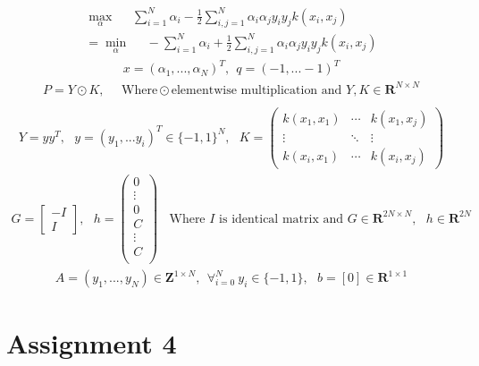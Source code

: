 \documentclass[a4paper,11pt]{article}
\begin{document}
\begin{eqnarray*}
\max_{\alpha} \:\:\:\:\:\:   \sum^N_{i=1} \alpha_i -\frac{1}{2} \sum^N_{i,j=1} \alpha_i \alpha_j y_i y_j k(x_i,x_j) \\
= \min_{\alpha} \:\:\:\:\:\:  -\sum^N_{i=1} \alpha_i +\frac{1}{2} \sum^N_{i,j=1} \alpha_i \alpha_j y_i y_j k(x_i,x_j)
\end{eqnarray*}
\begin{eqnarray*}
x= (\alpha_1,...,\alpha_N)^T, \:\: q=(-1,...-1)^T  
\end{eqnarray*}
\begin{eqnarray*}
P = Y \odot K, \:\:\:\:\:\: \mbox{Where} \odot \mbox{elementwise multiplication and }Y, K \in \mathbf{R}^{N \times N} \\
\end{eqnarray*}
\begin{eqnarray*}
Y = yy^T, \:\:\: y=(y_1,...y_i)^T \in \{ -1, 1\}^N, \:\:\:
K = 
\left(
\begin{array}{cccc}
k(x_1,x_1) & \cdots & k(x_1,x_j) \\
 \vdots & \ddots &  \vdots  \\
 k(x_i,x_1) & \cdots & k(x_i,x_j)
\end{array}
\right)
\end{eqnarray*}
\begin{eqnarray*}
G = 
\left[
\begin{array}{cccc}
-I \\
 I 
\end{array}
\right],  \:\:\:
h = 
\left(
\begin{array}{cccc}
0 \\
 \vdots  \\
0  \\
C \\
 \vdots  \\
C  \\
\end{array}
\right)
\:\:\:\: \mbox{Where } I \mbox{ is identical matrix and } G \in \mathbf{R}^{2N \times N}, \:\:\: h \in \mathbf{R}^{2N}
\end{eqnarray*}
\begin{eqnarray*}
A = (y_1,...,y_N) \in \mathbf{Z}^{1 \times N}, \:\: \forall_{i=0}^N \: y_i \in \{-1,1\}, \:\:\: b = [0] \in \mathbf{R}^{1 \times 1}
\end{eqnarray*}


\section*{Assignment 4}
\end{document}
